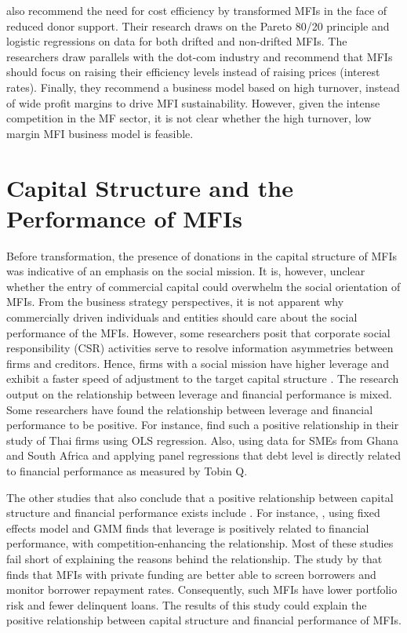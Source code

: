 \documentclass[a4paper,nobind]{templates/ociamthesis}
\begin{document}
\textcite{serrano2014microfinance} also recommend the need for cost efficiency by transformed MFIs in the face of reduced donor support. Their research draws on the Pareto 80/20 principle and logistic regressions on data for both drifted and non-drifted MFIs. The researchers draw parallels with the dot-com industry and recommend that MFIs should focus on raising their efficiency levels instead of raising prices (interest rates). Finally, they recommend a business model based on high turnover, instead of wide profit margins to drive MFI sustainability. However, given the intense competition in the MF sector, it is not clear whether the high turnover, low margin MFI business model is feasible.

\hypertarget{capital-structure-and-the-performance-of-mfis}{%
\section{Capital Structure and the Performance of MFIs}\label{capital-structure-and-the-performance-of-mfis}}

\noindent Before transformation, the presence of donations in the capital structure of MFIs was indicative of an emphasis on the social mission. It is, however, unclear whether the entry of commercial capital could overwhelm the social orientation of MFIs. From the business strategy perspectives, it is not apparent why commercially driven individuals and entities should care about the social performance of the MFIs. However, some researchers posit that corporate social responsibility (CSR) activities serve to resolve information asymmetries between firms and creditors. Hence, firms with a social mission have higher leverage and exhibit a faster speed of adjustment to the target capital structure \autocite{yang2018does}.
The research output on the relationship between leverage and financial performance is mixed. Some researchers have found the relationship between leverage and financial performance to be positive. For instance,\textcite{detthamrong2017corporate} find such a positive relationship in their study of Thai firms using OLS regression. Also, \textcite{abor2007debt} using data for SMEs from Ghana and South Africa and applying panel regressions that debt level is directly related to financial performance as measured by Tobin Q.

The other studies that also conclude that a positive relationship between capital structure and financial performance exists include \autocite{abor2005effect,berger2006capital,gill2011effect}. For instance, \textcite{fosu2013capital}, using fixed effects model and GMM finds that leverage is positively related to financial performance, with competition-enhancing the relationship. Most of these studies fail short of explaining the reasons behind the relationship. The study by \textcite{chakravarty2015role} that finds that MFIs with private funding are better able to screen borrowers and monitor borrower repayment rates. Consequently, such MFIs have lower portfolio risk and fewer delinquent loans. The results of this study could explain the positive relationship between capital structure and financial performance of MFIs.
\end{document}
